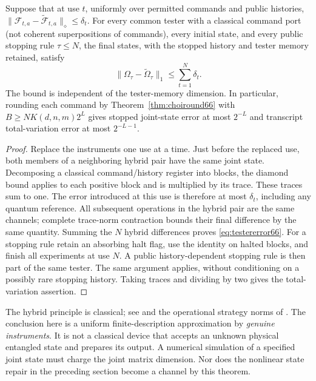 \begin{theorem}\label{thm:adaptivediamond66}
Suppose that at use $t$, uniformly over permitted commands and public
histories,
$\|\mathcal F_{t,a}-\widetilde{\mathcal F}_{t,a}\|_\diamond\le\delta_t$.
For every common tester with a classical command port (not coherent
superpositions of commands), every initial state, and every public stopping
rule $\tau\le N$, the final states, with the stopped history and tester
memory retained, satisfy
\begin{equation}\label{eq:testererror66}
 \|\Omega_\tau-\widetilde\Omega_\tau\|_1
                  \le\sum_{t=1}^N\delta_t.
\end{equation}
The bound is independent of the tester-memory dimension. In particular,
rounding each command by Theorem~\ref{thm:choiround66} with
$B\ge N K(d,n,m)2^L$ gives stopped joint-state error at most $2^{-L}$
and transcript total-variation error at most $2^{-L-1}$.
\end{theorem}
\begin{proof}
Replace the instruments one use at a time. Just before the replaced
use, both members of a neighboring hybrid pair have the same joint
state. Decomposing a classical command/history register into blocks,
the diamond bound applies to each positive block and is multiplied by
its trace. These traces sum to one. The error introduced at this use
is therefore at most $\delta_t$, including any quantum reference.
All subsequent operations in the hybrid pair are the same channels;
complete trace-norm contraction bounds their final difference by the
same quantity. Summing the $N$ hybrid differences proves
\eqref{eq:testererror66}. For a stopping rule retain an absorbing halt
flag, use the identity on halted blocks, and finish all experiments at
use $N$. A public history-dependent stopping rule is then part of the
same tester. The same argument applies, without conditioning on a
possibly rare stopping history. Taking traces and dividing by two
gives the total-variation assertion.
\end{proof}
The hybrid principle is classical; see
\cite[Section~3.3, equation~(3.306)]{Watrous65} and the operational
strategy norms of \cite{Gutoski66}. The conclusion here is a uniform
finite-description approximation by \emph{genuine instruments}. It is
not a classical device that accepts an unknown physical entangled
state and prepares its output. A numerical simulation of a specified
joint state must charge the joint matrix dimension. Nor does the
nonlinear state repair in the preceding section become a channel by
this theorem.

